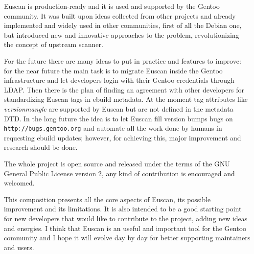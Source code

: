 
Euscan is production-ready and it is used and supported by the Gentoo community. It was built upon ideas collected from other projects and already implemented and widely used in other communities, first of all the Debian one, but introduced new and innovative approaches to the problem, revolutionizing the concept of upstream scanner.

For the future there are many ideas to put in practice and features to improve: for the near future the main task is to migrate Euscan inside the Gentoo infrastructure and let developers login with their Gentoo credentials through LDAP. Then there is the plan of finding an agreement with other developers for standardizing Euscan tags in ebuild metadata. At the moment tag attributes like \emph{versionmangle} are supported by Euscan but are not defined in the metadata DTD.
In the long future the idea is to let Euscan fill version bumps bugs on \texttt{http://bugs.gentoo.org} and automate all the work done by humans in requesting ebuild updates; however, for achieving this, major improvement and research should be done.

The whole project is open source and released under the terms of the GNU General Public License version 2, any kind of contribution is encouraged and welcomed.

This composition presents all the core aspects of Euscan, its possible improvement and its limitations. It is also intended to be a good starting point for new developers that would like to contribute to the project, adding new ideas and energies.
I think that Euscan is an useful and important tool for the Gentoo community and I hope it will evolve day by day for better supporting maintainers and users.
